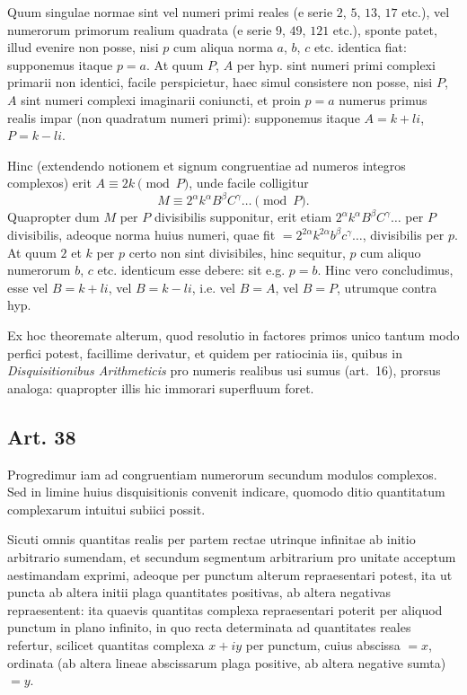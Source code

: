 \documentclass[12pt]{article}
\newcommand{\art}[1]{\subsection*{Art. #1}}
\begin{document}
Quum singulae normae sint vel numeri primi reales (e serie $2$, $5$, $13$, $17$ etc.), vel numerorum primorum realium quadrata (e serie $9$, $49$, $121$ etc.), sponte patet, illud evenire non posse, nisi $p$ cum aliqua norma $a$, $b$, $c$ etc. identica fiat: supponemus itaque $p=a$. At quum $P$, $A$ per hyp. sint numeri primi complexi primarii non identici, facile perspicietur, haec simul consistere non posse, nisi $P$, $A$ sint numeri complexi imaginarii coniuncti, et proin $p=a$ numerus primus realis impar (non quadratum numeri primi): supponemus itaque $A=k+li$, $P=k-li$.

Hinc (extendendo notionem et signum congruentiae ad numeros integros complexos) erit $A\equiv 2k \pmod{P}$, unde facile colligitur
\[
M\equiv 2^{\alpha}k^{\alpha}B^{\beta}C^{\gamma}\ldots \pmod{P}.
\]
Quapropter dum $M$ per $P$ divisibilis supponitur, erit etiam $2^{\alpha}k^{\alpha}B^{\beta}C^{\gamma}\ldots$ per $P$ divisibilis, adeoque norma huius numeri, quae fit $=2^{2\alpha}k^{2\alpha}b^{\beta}c^{\gamma}\ldots$, divisibilis per $p$. At quum $2$ et $k$ per $p$ certo non sint divisibiles, hinc sequitur, $p$ cum aliquo numerorum $b$, $c$ etc. identicum esse debere: sit e.g. $p=b$. Hinc vero concludimus, esse vel $B=k+li$, vel $B=k-li$, i.e. vel $B=A$, vel $B=P$, utrumque contra hyp.

Ex hoc theoremate alterum, quod resolutio in factores primos unico tantum modo perfici potest, facillime derivatur, et quidem per ratiocinia iis, quibus in \textit{Disquisitionibus Arithmeticis} pro numeris realibus usi sumus (art.~16), prorsus analoga: quapropter illis hic immorari superfluum foret.

\art{38}

Progredimur iam ad congruentiam numerorum secundum modulos complexos. Sed in limine huius disquisitionis convenit indicare, quomodo ditio quantitatum complexarum intuitui subiici possit.

Sicuti omnis quantitas realis per partem rectae utrinque infinitae ab initio arbitrario sumendam, et secundum segmentum arbitrarium pro unitate acceptum aestimandam exprimi, adeoque per punctum alterum repraesentari potest, ita ut puncta ab altera initii plaga quantitates positivas, ab altera negativas repraesentent: ita quaevis quantitas complexa repraesentari poterit per aliquod punctum in plano infinito, in quo recta determinata ad quantitates reales refertur, scilicet quantitas complexa $x+iy$ per punctum, cuius abscissa $=x$, ordinata (ab altera lineae abscissarum plaga positive, ab altera negative sumta) $=y$.
\end{document}
